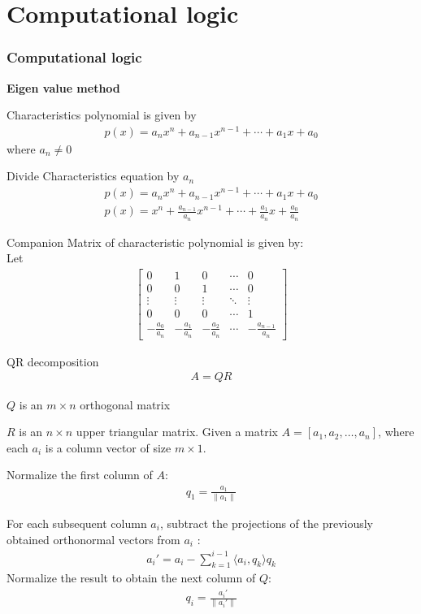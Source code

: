 \documentclass{beamer}
\theoremstyle{remark}
\providecommand{\norm}[1]{\lVert#1\rVert}
\numberwithin{equation}{section}
\begin{document}
\section{Computational logic}
\begin{frame}[fragile]
    \frametitle{Computational logic}
    \textbf{Eigen value method}
    
    \item Characteristics polynomial is given by
    \begin{align}
     p(x)=a_nx^n+a_{n-1}x^{n-1}+\cdots +a_1x+a_0   
    \end{align}
    where $a_n \neq 0$
    \item Divide Characteristics equation by $a_n$
    \begin{align}
        p(x)= a_nx^n+a_{n-1}x^{n-1}+\cdots +a_1x+a_0     \\
        p(x)=x^n+\frac{a_{n-1}}{a_n}x^{n-1}+\cdots +\frac{a_1}{a_n}x+\frac{a_0}{a_n}
    \end{align}
    \item Companion Matrix of characteristic polynomial is given by:\\
    Let
    \begin{align}
        \begin{bmatrix}
        0 & 1 & 0 & \cdots & 0 \\
        0 & 0 & 1 & \cdots & 0 \\
        \vdots & \vdots & \vdots & \ddots & \vdots \\
        0 & 0 & 0 & \cdots & 1 \\
        -\frac{a_0}{a_n} & -\frac{a_1}{a_n} & -\frac{a_2}{a_n} & \cdots & -\frac{a_{n-1}}{a_n}
    \end{bmatrix}
    \end{align}
\end{frame}
\begin{frame}[fragile]
    \item QR decomposition 
    \begin{align}
    A = QR
    \end{align}
    \item $Q$ is an $ m \times n $ orthogonal matrix
    \item $R$ is an $n \times n$ upper triangular matrix.
    Given a matrix $ A = [a_1, a_2, \dots, a_n] $, where each $ a_i $ is a column vector of size $ m \times 1 $.

    \item Normalize the first column of $A$:
    \begin{align}
    q_1 = \frac{a_1}{\norm{a_1}}
    \end{align}
    
    \item  For each subsequent column $ a_i $, subtract the projections of the previously obtained orthonormal vectors from $ a_i $ :
    \begin{align}
    a_i' = a_i - \sum_{k=1}^{i-1} \langle a_i, q_k \rangle q_k
    \end{align}
    Normalize the result to obtain the next column of \( Q \):
    \begin{align}
    q_i = \frac{a_i'}{\norm{a_i'}}
    \end{align}
\end{frame}
\end{document}
